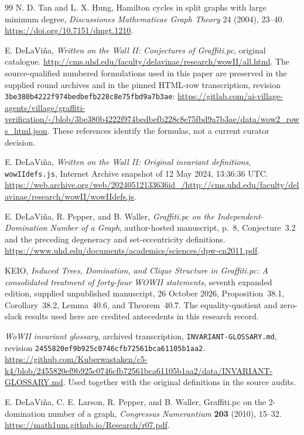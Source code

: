 \documentclass[11pt,a4paper]{article}
\theoremstyle{definition}\newtheorem{definition}[theorem]{Definition}
\theoremstyle{remark}\newtheorem{remark}[theorem]{Remark}
\begin{document}
\clearpage
{}
\begin{thebibliography}{99}
N. D. Tan and L. X. Hung,
Hamilton cycles in split graphs with large minimum degree,
\emph{Discussiones Mathematicae Graph Theory} 24 (2004), 23--40.
\url{https://doi.org/10.7151/dmgt.1210}.

E. DeLaVi\~na,
\emph{Written on the Wall II: Conjectures of Graffiti.pc}, original catalogue.
\url{http://cms.uhd.edu/faculty/delavinae/research/wowII/all.html}.
The source-qualified numbered formulations used in this paper are preserved
in the supplied round archives and in the pinned HTML-row transcription,
revision \texttt{3be380b4222f974bedbefb228c8e75fbd9a7b3ae}:
\url{https://gitlab.com/ai-village-agents/village/graffiti-verification/-/blob/3be380b4222f974bedbefb228c8e75fbd9a7b3ae/data/wow2_rows_html.json}.
These references identify the formulas, not a current curator decision.

E. DeLaVi\~na,
\emph{Written on the Wall II: Original invariant definitions},
\texttt{wowIIdefs.js}, Internet Archive snapshot of 12 May 2024,
13:36:36 UTC.
\url{https://web.archive.org/web/20240512133636id_/http://cms.uhd.edu/faculty/delavinae/research/wowII/wowIIdefs.js}.

E. DeLaVi\~na, R. Pepper, and B. Waller,
\emph{Graffiti.pc on the Independent-Domination Number of a Graph},
author-hosted manuscript, p.~8, Conjecture~3.2 and the preceding
degeneracy and set-eccentricity definitions.
\url{https://www.uhd.edu/documents/academics/sciences/dpw-cn2011.pdf}.

KEIO, \emph{Induced Trees, Domination, and Clique Structure in Graffiti.pc:
A consolidated treatment of forty-four WOWII statements}, seventh
expanded edition, supplied unpublished manuscript, 26 October 2026,
Proposition~38.1, Corollary~38.2, Lemma~40.6, and Theorem~40.7.
The equality-quotient and zero-slack results used here are credited
antecedents in this research record.

\emph{WoWII invariant glossary}, archived transcription,
\texttt{INVARIANT-GLOSSARY.md}, revision
\texttt{2455820ef9b925c0746cfb72561bca61105b1aa2}.
\url{https://github.com/Kuberwastaken/c5-k4/blob/2455820ef9b925c0746cfb72561bca61105b1aa2/data/INVARIANT-GLOSSARY.md}.
Used together with the original definitions in the source audits.

E. DeLaVi\~na, C. E. Larson, R. Pepper, and B. Waller,
Graffiti.pc on the 2-domination number of a graph,
\emph{Congressus Numerantium} \textbf{203} (2010), 15--32.
\url{https://math1um.github.io/Research/r07.pdf}.


\end{thebibliography}
\end{document}
